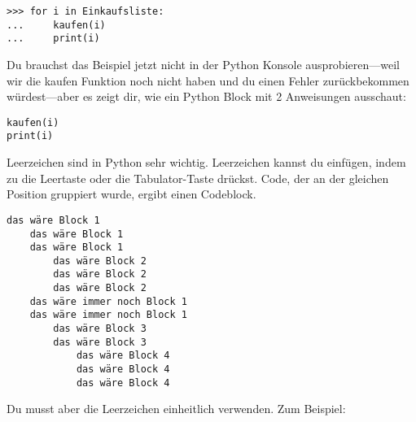 \begin{Verbatim}[frame=single]
>>> for i in Einkaufsliste:
...     kaufen(i)
...     print(i)
\end{Verbatim}

Du brauchst das Beispiel jetzt nicht in der Python Konsole ausprobieren---weil wir die kaufen Funktion noch nicht haben und du einen Fehler zurückbekommen würdest---aber es zeigt dir, wie ein Python Block mit 2 Anweisungen ausschaut:

\begin{Verbatim}[frame=single]
kaufen(i)
print(i)
\end{Verbatim}

Leerzeichen sind in Python sehr wichtig. Leerzeichen kannst du einfügen, indem zu die Leertaste oder die Tabulator-Taste drückst. Code, der an der gleichen Position gruppiert wurde, ergibt einen Codeblock.

\begin{Verbatim}[frame=single]
    das wäre Block 1
    das wäre Block 1
    das wäre Block 1
        das wäre Block 2
        das wäre Block 2
        das wäre Block 2
    das wäre immer noch Block 1
    das wäre immer noch Block 1
        das wäre Block 3
        das wäre Block 3
            das wäre Block 4
            das wäre Block 4
            das wäre Block 4
\end{Verbatim}
Du musst aber die Leerzeichen einheitlich verwenden. Zum Beispiel:

